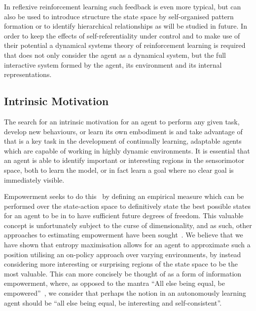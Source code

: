\documentclass{article}
\begin{document}
In reflexive reinforcement learning such 
feedback is even more typical, but can also be used to introduce structure the 
state space by self-organised pattern formation or to identify hierarchical 
relationships as will be studied in future. In order to keep the effects of 
self-referentiality under control and to make use of their potential
a dynamical systems theory of reinforcement learning is required that 
does not only consider the agent as a dynamical system, but the full interactive 
system formed by the agent, its environment and its internal representations.

\subsection{Intrinsic Motivation}
The search for an intrinsic motivation for an agent to perform any given task, develop new behaviours, or learn its own embodiment is and take advantage of that is a key task in the development of continually learning, adaptable agents which are capable of working in highly dynamic environments. It is essential that an agent is able to identify important or interesting regions in the sensorimotor space, both to learn the model, or in fact learn a goal where no clear goal is immediately visible. 

Empowerment seeks to do this~\citep{salge2014empowerment} by defining an empirical measure which can be performed over the state-action space to definitively state the best possible states for an agent to be in to have sufficient future degrees of freedom. This valuable concept is unfortunately subject to the curse of dimensionality, and as such, other approaches to estimating empowerment have been sought~\citep{zhao2019learning}. We believe that we have shown that entropy maximisation allows for an agent to approximate such a position utilising an on-policy approach over varying environments, by instead considering more interesting or surprising regions of the state space to be the most valuable.
This can more concisely be thought of as a form of information empowerment, where, as opposed to the mantra ``All else being equal, be empowered''~\citep{klyubin2005all}, we consider that perhaps the notion in an autonomously learning agent should be ``all else being equal, be interesting and self-consistent''.



\end{document}
